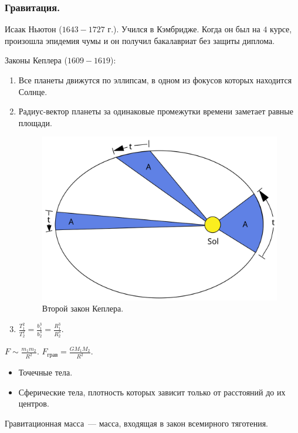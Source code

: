 \documentclass[12pt]{article}
\begin{document}
	\subsubsection{Гравитация.}
	\begin{definition}
		Исаак Ньютон ($1643 - 1727$ г.). Учился в Кэмбридже. Когда он был на $4$ курсе, произошла эпидемия чумы и он получил бакалавриат без защиты диплома.
	\end{definition}
	\begin{definition}
		Законы Кеплера ($1609 - 1619$):
		\begin{enumerate}
		\item Все планеты движутся по эллипсам, в одном из фокусов которых находится Солнце.
		\item Радиус-вектор планеты за одинаковые промежутки времени заметает равные площади. \\
		\begin{figure}[H]
			\includegraphics[height=0.25\textwidth]{extra-materials/Второй-закон-Кеплера}
			\caption{Второй закон Кеплера.}
		\end{figure}
		\item $\frac{T_1^2}{T_2^2} = \frac{b_1^3}{b_2^3} = \frac{R_1^3}{R_2^3}$.
		\end{enumerate}
	\end{definition}
	\begin{definition}
		$F \sim \frac{m_1m_2}{R^2}$. $F_{\text{грав}} = \frac{GM_1M_2}{R^2}$.
	\end{definition}
	\begin{statement}
		\begin{itemize}
			\item Точечные тела.
			\item Сферические тела, плотность которых зависит только от расстояний до их центров.
		\end{itemize}
	\end{statement}
	\begin{definition}
		Гравитационная масса~--- масса, входящая в закон всемирного тяготения.
	\end{definition}
\end{document}
